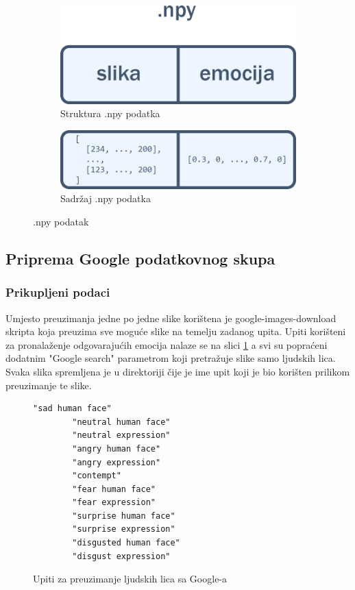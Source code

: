 \documentclass[times, utf8, zavrsni,numeric,pstricks]{fer}
\begin{document}
\begin{figure}[H]\label{fig:npy_array}
	\begin{subfigure}[b]{0.5\linewidth}
	  	\centering
		\includegraphics[width=\linewidth]{numpy_slika_emocija.png}
		\caption{Struktura .npy podatka}		
	\end{subfigure}
	\begin{subfigure}[b]{0.5\linewidth}
	  	\centering
		\includegraphics[width=\linewidth]{numpy_imgdata_emo.png}
		\caption{Sadržaj .npy podatka}
	\end{subfigure}	
	\caption{.npy podatak}	
\end{figure}


\subsection{Priprema Google podatkovnog skupa}
\subsubsection{Prikupljeni podaci}
Umjesto preuzimanja jedne po jedne slike korištena je google-images-download skripta \cite{google-images-download} koja preuzima sve moguće slike na temelju zadanog upita. Upiti korišteni za pronalaženje odgovarajućih emocija nalaze se na slici \ref{cb:google_queries} a svi su popraćeni dodatnim "Google search" parametrom koji pretražuje slike samo ljudskih lica. Svaka slika spremljena je u direktoriji čije je ime upit koji je bio korišten prilikom preuzimanje te slike. 

\begin{figure}[H]
	\centering
		\begin{Verbatim}[fontsize=\small]
		"sad human face"
		"neutral human face"
		"neutral expression"
		"angry human face"
		"angry expression"
		"contempt"
		"fear human face"
		"fear expression"
		"surprise human face"
		"surprise expression"
		"disgusted human face"
		"disgust expression"
		\end{Verbatim}
	\caption{Upiti za preuzimanje ljudskih lica sa Google-a}
	\label{cb:google_queries}
\end{figure}
\end{document}
